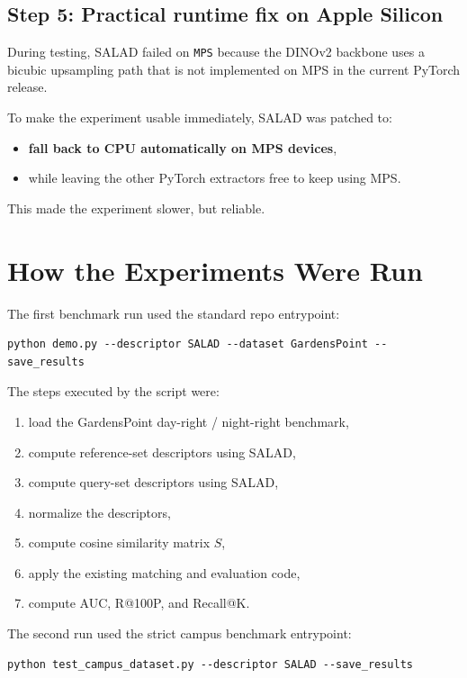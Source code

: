 \documentclass[11pt]{article}
\begin{document}
\subsection*{Step 5: Practical runtime fix on Apple Silicon}
During testing, SALAD failed on \texttt{MPS} because the DINOv2 backbone uses a bicubic upsampling path that is not implemented on MPS in the current PyTorch release.

To make the experiment usable immediately, SALAD was patched to:
\begin{itemize}[leftmargin=*]
  \item \textbf{fall back to CPU automatically on MPS devices},
  \item while leaving the other PyTorch extractors free to keep using MPS.
\end{itemize}

This made the experiment slower, but reliable.

\section*{How the Experiments Were Run}
The first benchmark run used the standard repo entrypoint:

\begin{verbatim}
python demo.py --descriptor SALAD --dataset GardensPoint --save_results
\end{verbatim}

The steps executed by the script were:
\begin{enumerate}[leftmargin=*]
  \item load the GardensPoint day-right / night-right benchmark,
  \item compute reference-set descriptors using SALAD,
  \item compute query-set descriptors using SALAD,
  \item normalize the descriptors,
  \item compute cosine similarity matrix $S$,
  \item apply the existing matching and evaluation code,
  \item compute AUC, R@100P, and Recall@K.
\end{enumerate}

The second run used the strict campus benchmark entrypoint:

\begin{verbatim}
python test_campus_dataset.py --descriptor SALAD --save_results
\end{verbatim}
\end{document}
